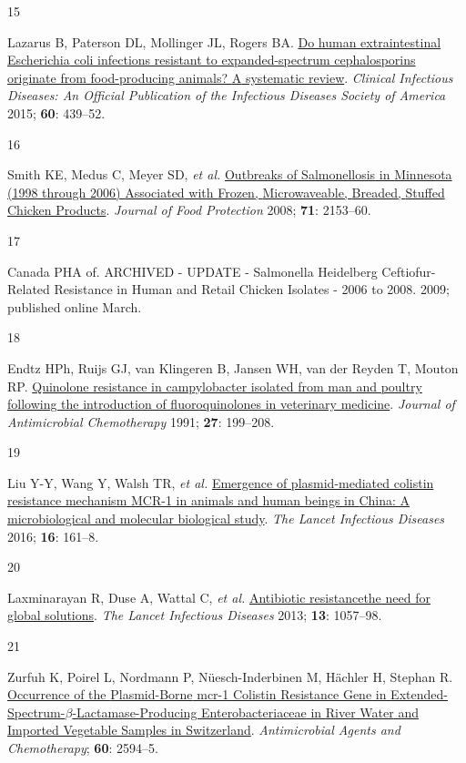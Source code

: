 \documentclass[
  11pt,
  paper=a4,
  ,captions=tableheading
]{scrartcl}
\newlength{\cslhangindent}
\newlength{\csllabelwidth}
\newenvironment{CSLReferences}[2] %
 {%
  \setlength{\parindent}{0pt}
  \ifodd #1 \everypar{\setlength{\hangindent}{\cslhangindent}}\ignorespaces\fi
  \ifnum #2 > 0
  \setlength{\parskip}{#2\baselineskip}
  \fi
 }%
 {}
\newcommand{\CSLLeftMargin}[1]{\parbox[t]{\csllabelwidth}{#1}}
\newcommand{\CSLRightInline}[1]{\parbox[t]{\linewidth - \csllabelwidth}{#1}\break}
\begin{document}
\begin{CSLReferences}{0}{0}
\leavevmode{}%
\CSLLeftMargin{15 }
\CSLRightInline{Lazarus B, Paterson DL, Mollinger JL, Rogers BA.
\href{https://doi.org/10.1093/cid/ciu785}{Do human extraintestinal
{Escherichia} coli infections resistant to expanded-spectrum
cephalosporins originate from food-producing animals? {A} systematic
review}. \emph{Clinical Infectious Diseases: An Official Publication of
the Infectious Diseases Society of America} 2015; \textbf{60}: 439--52.}

\leavevmode{}%
\CSLLeftMargin{16 }
\CSLRightInline{Smith KE, Medus C, Meyer SD, \emph{et al.}
\href{https://doi.org/10.4315/0362-028X-71.10.2153}{Outbreaks of
{Salmonellosis} in {Minnesota} (1998 through 2006) {Associated} with
{Frozen}, {Microwaveable}, {Breaded}, {Stuffed Chicken Products}}.
\emph{Journal of Food Protection} 2008; \textbf{71}: 2153--60.}

\leavevmode{}%
\CSLLeftMargin{17 }
\CSLRightInline{Canada PHA of. {ARCHIVED} - {UPDATE} - {Salmonella
Heidelberg Ceftiofur-Related Resistance} in {Human} and {Retail Chicken
Isolates} - 2006 to 2008. 2009; published online March.}

\leavevmode{}%
\CSLLeftMargin{18 }
\CSLRightInline{Endtz HPh, Ruijs GJ, van Klingeren B, Jansen WH, van der
Reyden T, Mouton RP.
\href{https://doi.org/10.1093/jac/27.2.199}{Quinolone resistance in
campylobacter isolated from man and poultry following the introduction
of fluoroquinolones in veterinary medicine}. \emph{Journal of
Antimicrobial Chemotherapy} 1991; \textbf{27}: 199--208.}

\leavevmode{}%
\CSLLeftMargin{19 }
\CSLRightInline{Liu Y-Y, Wang Y, Walsh TR, \emph{et al.}
\href{https://doi.org/10.1016/S1473-3099(15)00424-7}{Emergence of
plasmid-mediated colistin resistance mechanism {MCR-1} in animals and
human beings in {China}: A microbiological and molecular biological
study}. \emph{The Lancet Infectious Diseases} 2016; \textbf{16}:
161--8.}

\leavevmode{}%
\CSLLeftMargin{20 }
\CSLRightInline{Laxminarayan R, Duse A, Wattal C, \emph{et al.}
\href{https://doi.org/10.1016/S1473-3099(13)70318-9}{Antibiotic
resistance\textemdash the need for global solutions}. \emph{The Lancet
Infectious Diseases} 2013; \textbf{13}: 1057--98.}

\leavevmode{}%
\CSLLeftMargin{21 }
\CSLRightInline{Zurfuh K, Poirel L, Nordmann P, Nüesch-Inderbinen M,
Hächler H, Stephan R.
\href{https://doi.org/10.1128/AAC.00066-16}{Occurrence of the
{Plasmid-Borne} mcr-1 {Colistin Resistance Gene} in
{Extended-Spectrum-\(\beta\)-Lactamase-Producing Enterobacteriaceae} in
{River Water} and {Imported Vegetable Samples} in {Switzerland}}.
\emph{Antimicrobial Agents and Chemotherapy}; \textbf{60}: 2594--5.}


\end{CSLReferences}
\end{document}
